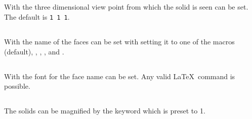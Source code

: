 \documentclass[11pt,english,BCOR10mm,DIV12,bibliography=totoc,parskip=false,smallheadings
    headexclude,footexclude,oneside]{pst-doc}
\begin{document}
\clearpage

\subsection{}

With  the three dimensional view point from which the 
solid is seen can be set. The default is \verb=1 1 1=.

\begin{LTXexample}[width=10.5cm,rframe=,wide]
\psTetrahedron
\psTetrahedron[Viewpoint=-1 1 .5]
\psTetrahedron[Viewpoint=0.4 -1 .5] 
\end{LTXexample}

\subsection{}

With  the name of the faces can be set with setting
it to one of the macros  (default), , ,
, and .

\begin{LTXexample}[width=10.5cm,rframe=,wide]
\psHexahedron%
\psHexahedron[faceName=\alph]%
\psHexahedron[faceName=\Roman] 
\end{LTXexample}


\subsection{}

With  the font for the face name can be set.
Any valid \LaTeX\ command is possible.

\begin{LTXexample}[width=10.5cm,rframe=,wide]
\psHexahedron%
\psHexahedron[faceNameFont=\Huge]%
\psHexahedron[faceNameFont=\Huge\sffamily] 
\end{LTXexample}

\subsection{}

The solids can be magnified by the keyword 
which is preset to 1.

\begin{LTXexample}[width=8cm,rframe=]
\psOctahedron[Frame=false]
\psOctahedron[Frame=false,psscale=2]
\end{LTXexample}
\end{document}
